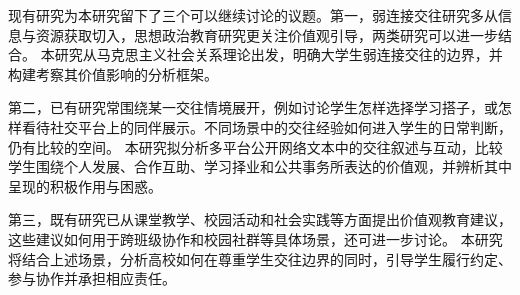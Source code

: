 现有研究为本研究留下了三个可以继续讨论的议题。第一，弱连接交往研究多从信息与资源获取切入，思想政治教育研究更关注价值观引导，两类研究可以进一步结合。
本研究从马克思主义社会关系理论出发，明确大学生弱连接交往的边界，并构建考察其价值影响的分析框架。

第二，已有研究常围绕某一交往情境展开，例如讨论学生怎样选择学习搭子，或怎样看待社交平台上的同伴展示。不同场景中的交往经验如何进入学生的日常判断，仍有比较的空间。
本研究拟分析多平台公开网络文本中的交往叙述与互动，比较学生围绕个人发展、合作互助、学习择业和公共事务所表达的价值观，并辨析其中呈现的积极作用与困惑。

第三，既有研究已从课堂教学、校园活动和社会实践等方面提出价值观教育建议，这些建议如何用于跨班级协作和校园社群等具体场景，还可进一步讨论。
本研究将结合上述场景，分析高校如何在尊重学生交往边界的同时，引导学生履行约定、参与协作并承担相应责任。
